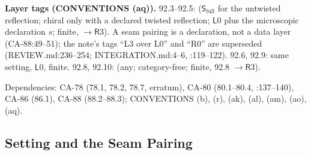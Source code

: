 \textbf{Layer tags (CONVENTIONS (aq)).}  92.3--92.5: (\(\mathsf S_{\mathrm{full}}\) for the untwisted reflection;
chiral only with a declared twisted reflection; \(\mathsf L0\) plus the microscopic declaration \(s\); finite,
\(\to\mathsf R3\)).  A seam pairing is a declaration, not a data layer (CA-88:49--51); the note's tags ``L3 over
L0'' and ``R0'' are superseded (REVIEW.md:236--254; INTEGRATION.md:4--6, :119--122).  92.6, 92.9: same setting,
\(\mathsf L0\), finite.  92.8, 92.10: (any; category-free; finite, 92.8 \(\to\mathsf R3\)).

Dependencies: CA-78 (78.1, 78.2, 78.7, erratum), CA-80 (80.1--80.4, :137--140), CA-86 (86.1), CA-88 (88.2--88.3);
CONVENTIONS (b), (r), (ak), (al), (am), (ao), (aq).


\subsection{Setting and the Seam Pairing}

